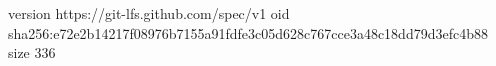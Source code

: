 version https://git-lfs.github.com/spec/v1
oid sha256:e72e2b14217f08976b7155a91fdfe3c05d628c767cce3a48c18dd79d3efc4b88
size 336

